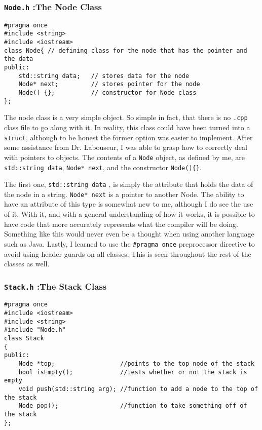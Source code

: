 \documentclass[letterpaper, 10pt]{article}
\begin{document}
\subsubsection{\texttt{Node.h} :The Node Class}
\begin{addmargin}[-5em]{1em}
    

\begin{small}
\begin{verbatim}
#pragma once
#include <string>
#include <iostream>
class Node{	// defining class for the node that has the pointer and the data
public:		
	std::string data;	// stores data for the node
	Node* next;			// stores pointer for the node
	Node() {};			// constructor for Node class
};

\end{verbatim}
\end{small}
\end{addmargin}

The node class is a very simple object. So simple in fact, that there is no \texttt{.cpp} class file to go along with it. In reality, this class could have been turned into a \texttt{struct}, although to be honest the former option was easier to implement. After some assistance from Dr. Labouseur, I was able to grasp how to correctly deal with pointers to objects. The contents of a \texttt{Node} object, as defined by me, are \texttt{std::string data}, \texttt{Node* next}, and the constructor \texttt{Node()\{\}}.



The first one, \texttt{std::string data} , is simply the attribute that holds the data of the node in a string. \texttt{Node* next} is a pointer to another Node. The ability to have an attribute of this type is somewhat new to me, although I do see the use of it. With it, and with a general understanding of how it works, it is possible to have code that more accurately represents what the compiler will be doing. Something like this would never even be a thought when using another language such as Java. Lastly, I learned to use the \texttt{\#pragma once} preprocessor directive to avoid using header guards on all classes. This is seen throughout the rest of the classes as well.



\subsubsection{\texttt{Stack.h} :The Stack Class}
\begin{addmargin}[-5em]{1em}
\begin{small}
\begin{verbatim}
#pragma once
#include <iostream>
#include <string>
#include "Node.h"
class Stack
{
public:
	Node *top;					//points to the top node of the stack
	bool isEmpty();				//tests whether or not the stack is empty
	void push(std::string arg); //function to add a node to the top of the stack
	Node pop();					//function to take something off of the stack
};

\end{verbatim}
\end{small}
\end{addmargin}
\end{document}

